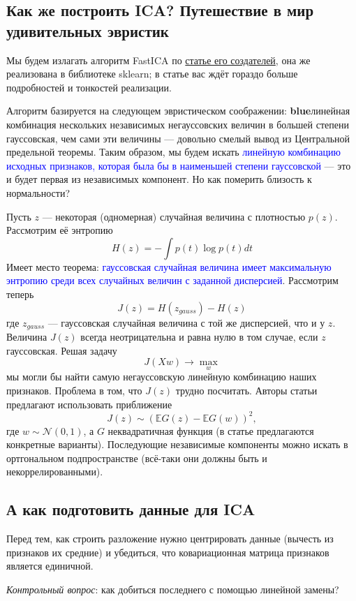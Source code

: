 \documentclass{amsart}
\theoremstyle{definition}
\theoremstyle{remark}
\numberwithin{equation}{section}
\begin{document}
\subsection{Как же построить ICA? Путешествие в мир удивительных эвристик} Мы будем излагать алгоритм FastICA по \href{https://www.cs.helsinki.fi/u/ahyvarin/papers/TNN99new.pdf}{статье его создателей}, она же реализована в библиотеке sklearn; в статье вас ждёт гораздо больше подробностей и тонкостей реализации.

Алгоритм базируется на следующем эвристическом соображении: \textbf{blue}{линейная комбинация нескольких независимых негауссовских величин в большей степени гауссовская, чем сами эти величины} --- довольно смелый вывод из   Центральной предельной теоремы. Таким образом, мы будем искать \textcolor{blue}{линейную комбинацию исходных признаков, которая была бы в наименьшей степени гауссовской} --- это и будет первая из независимых компонент. Но как померить близость к нормальности?

Пусть $z$ --- некоторая (одномерная) случайная величина с плотностью $p(z)$. Рассмотрим её энтропию
$$H(z) = -\int p(t)\log{p(t)}dt$$
Имеет место теорема: \textcolor{blue}{гауссовская случайная величина имеет максимальную энтропию среди всех случайных величин с заданной дисперсией}. Рассмотрим теперь 
$$J(z) = H(z_{gauss}) - H(z)$$
где $z_{gauss}$ --- гауссовская случайная величина с той же дисперсией, что и у $z$. Величина $J(z)$ всегда неотрицательна и равна нулю в том случае, если $z$ гауссовская. Решая задачу
$$J(Xw)\longrightarrow\max\limits_{w}$$
мы могли бы найти самую негауссовскую линейную комбинацию наших признаков. Проблема в том, что $J(z)$ трудно посчитать. Авторы статьи предлагают использовать приближение
$$J(z)\sim\left(\mathbb{E}G(z) - \mathbb{E}G(w)\right)^2,$$
где $w\sim\mathcal{N}(0,1)$, а $G$ неквадратичная функция (в статье предлагаются конкретные варианты). Последующие независимые компоненты можно искать в ортгональном подпространстве (всё-таки они должны быть и некоррелированными).

\subsection{А как подготовить данные для ICA} Перед тем, как строить разложение нужно центрировать данные (вычесть из признаков их средние) и убедиться, что ковариационная матрица признаков является единичной.

\textit{Контрольный вопрос}: как добиться последнего с помощью линейной замены?
\end{document}
